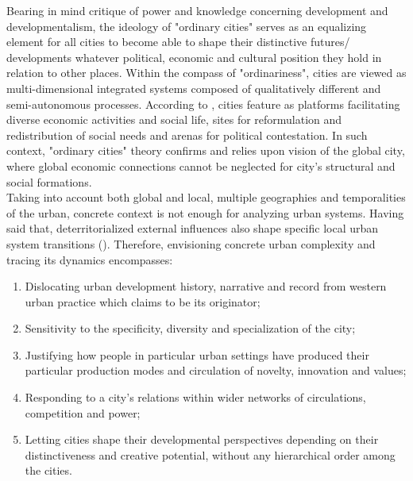 \documentclass[11pt]{report}
\begin{document}
{{{Bearing  in  mind  \href{Escobar}{\citealt{escobar_encountering_1995}} critique  of  power  and  knowledge  concerning  development  and developmentalism, the  ideology  of  "ordinary  cities"  serves as an equalizing  element  for  all  cities  to  become  able  to  shape  their  distinctive  futures/  developments whatever political, economic and cultural position they hold in relation to other places. 
Within  the  compass  of  "ordinariness",  cities are viewed  as  multi-dimensional  integrated  systems composed of qualitatively different and semi-autonomous processes.
According to  \href{Robinson}{\citealt{robinson_ordinary_2006}}, cities feature as  platforms facilitating  diverse  economic  activities  and  social  life,  sites for  reformulation  and redistribution of social needs and arenas for political contestation.
In such context, "ordinary cities" theory confirms and relies upon \href{Sassen}{\cite{sassen_global_1991}}  vision of the global city, where global economic connections cannot be neglected for city's structural  and  social  formations.
\\

Taking into account both global and local, multiple geographies and temporalities of the urban, concrete context is not enough for analyzing urban systems.
Having said that, deterritorialized external influences also shape specific local urban system transitions (\href{Robinson}{\citealt{robinson_urban_2013}}).
Therefore, envisioning concrete urban complexity and tracing its dynamics encompasses:

\begin{enumerate}
\item Dislocating urban development history, narrative and record from western urban practice which claims to be its originator;
\item Sensitivity to the specificity, diversity and specialization of the city;
\item Justifying how  people  in particular urban settings  have  produced their  particular  production modes and circulation of novelty, innovation and values;
\item Responding to a city's relations within wider networks of circulations, competition and power; 
\item Letting cities  shape their developmental perspectives depending  on  their  distinctiveness  and creative potential, without any hierarchical order among the cities.
\end{enumerate}

}}}
\end{document}
